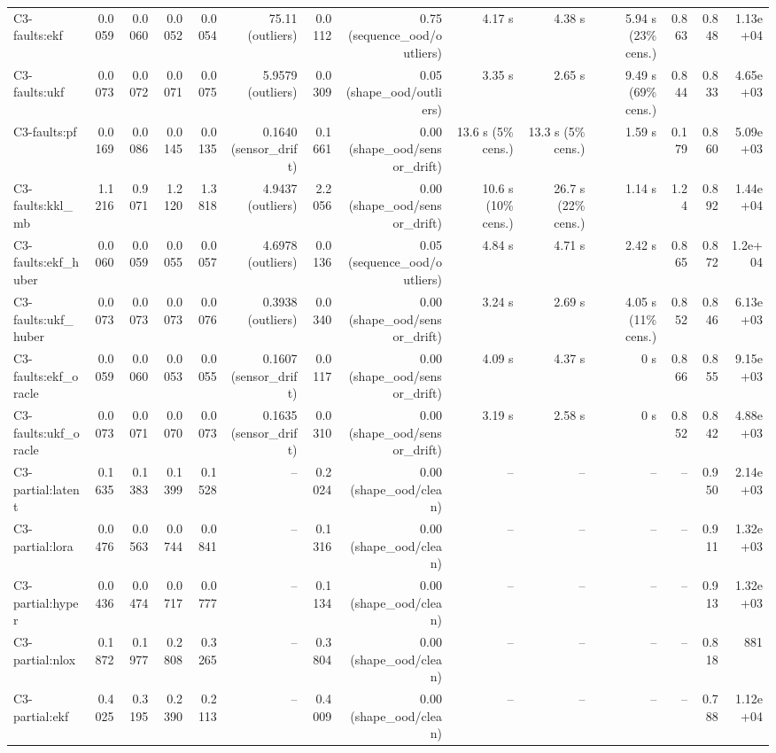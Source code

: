 \begin{table}[t]
\begin{tabular}{lrrrrrrrrrrrrr}
C3-faults:ekf & 0.0059 & 0.0060 & 0.0052 & 0.0054 & 75.11 (outliers) & 0.0112 & 0.75 (sequence\_ood/outliers) & 4.17 s & 4.38 s & 5.94 s (23\% cens.) & 0.863 & 0.848 & 1.13e+04 \\
C3-faults:ukf & 0.0073 & 0.0072 & 0.0071 & 0.0075 & 5.9579 (outliers) & 0.0309 & 0.05 (shape\_ood/outliers) & 3.35 s & 2.65 s & 9.49 s (69\% cens.) & 0.844 & 0.833 & 4.65e+03 \\
C3-faults:pf & 0.0169 & 0.0086 & 0.0145 & 0.0135 & 0.1640 (sensor\_drift) & 0.1661 & 0.00 (shape\_ood/sensor\_drift) & 13.6 s (5\% cens.) & 13.3 s (5\% cens.) & 1.59 s & 0.179 & 0.860 & 5.09e+03 \\
C3-faults:kkl\_mb & 1.1216 & 0.9071 & 1.2120 & 1.3818 & 4.9437 (outliers) & 2.2056 & 0.00 (shape\_ood/sensor\_drift) & 10.6 s (10\% cens.) & 26.7 s (22\% cens.) & 1.14 s & 1.24 & 0.892 & 1.44e+04 \\
C3-faults:ekf\_huber & 0.0060 & 0.0059 & 0.0055 & 0.0057 & 4.6978 (outliers) & 0.0136 & 0.05 (sequence\_ood/outliers) & 4.84 s & 4.71 s & 2.42 s & 0.865 & 0.872 & 1.2e+04 \\
C3-faults:ukf\_huber & 0.0073 & 0.0073 & 0.0073 & 0.0076 & 0.3938 (outliers) & 0.0340 & 0.00 (shape\_ood/sensor\_drift) & 3.24 s & 2.69 s & 4.05 s (11\% cens.) & 0.852 & 0.846 & 6.13e+03 \\
C3-faults:ekf\_oracle & 0.0059 & 0.0060 & 0.0053 & 0.0055 & 0.1607 (sensor\_drift) & 0.0117 & 0.00 (shape\_ood/sensor\_drift) & 4.09 s & 4.37 s & 0 s & 0.866 & 0.855 & 9.15e+03 \\
C3-faults:ukf\_oracle & 0.0073 & 0.0071 & 0.0070 & 0.0073 & 0.1635 (sensor\_drift) & 0.0310 & 0.00 (shape\_ood/sensor\_drift) & 3.19 s & 2.58 s & 0 s & 0.852 & 0.842 & 4.88e+03 \\
C3-partial:latent & 0.1635 & 0.1383 & 0.1399 & 0.1528 & – & 0.2024 & 0.00 (shape\_ood/clean) & – & – & – & – & 0.950 & 2.14e+03 \\
C3-partial:lora & 0.0476 & 0.0563 & 0.0744 & 0.0841 & – & 0.1316 & 0.00 (shape\_ood/clean) & – & – & – & – & 0.911 & 1.32e+03 \\
C3-partial:hyper & 0.0436 & 0.0474 & 0.0717 & 0.0777 & – & 0.1134 & 0.00 (shape\_ood/clean) & – & – & – & – & 0.913 & 1.32e+03 \\
C3-partial:nlox & 0.1872 & 0.1977 & 0.2808 & 0.3265 & – & 0.3804 & 0.00 (shape\_ood/clean) & – & – & – & – & 0.818 & 881 \\
C3-partial:ekf & 0.4025 & 0.3195 & 0.2390 & 0.2113 & – & 0.4009 & 0.00 (shape\_ood/clean) & – & – & – & – & 0.788 & 1.12e+04 \\

\end{tabular}
\end{table}
